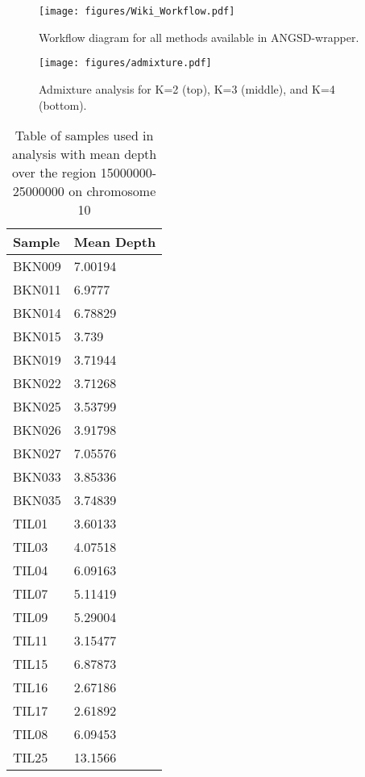 \renewcommand{\thefigure}{S\arabic{figure}}
\renewcommand{\thetable}{S\arabic{table}}
\setcounter{figure}{0}
\setcounter{table}{0}

\begin{figure}
\centering
\texttt{[image: figures/Wiki\_Workflow.pdf]}
\caption{Workflow diagram for all methods available in ANGSD-wrapper.}
\label{fig:supp2}
\end{figure}

\begin{figure}
\centering
\texttt{[image: figures/admixture.pdf]}
\caption{Admixture analysis for K=2 (top), K=3 (middle), and K=4 (bottom).}
\label{fig:suppadmix}
\end{figure}

\begin{table}
\begin{center}
	\begin{tabular} { | p{5cm} | p{5cm} | }
	\hline
	\textbf{Sample} & \textbf{Mean Depth} \\ \hline \hline
	BKN009 & 7.00194 \\ \hline
	BKN011 & 6.9777 \\ \hline
	BKN014 & 6.78829 \\ \hline
	BKN015 & 3.739 \\ \hline
	BKN019 & 3.71944 \\ \hline
	BKN022 & 3.71268 \\ \hline
	BKN025 & 3.53799 \\ \hline
	BKN026 & 3.91798 \\ \hline
	BKN027 & 7.05576 \\ \hline
	BKN033 & 3.85336 \\ \hline
	BKN035 & 3.74839 \\ \hline
	TIL01 & 3.60133 \\ \hline
	TIL03 & 4.07518 \\ \hline
	TIL04 & 6.09163 \\ \hline
	TIL07 & 5.11419 \\ \hline
	TIL09 & 5.29004 \\ \hline
	TIL11 & 3.15477 \\ \hline
	TIL15 & 6.87873 \\ \hline
	TIL16 & 2.67186 \\ \hline
	TIL17 & 2.61892 \\ \hline
	TIL08 & 6.09453 \\ \hline
	TIL25 & 13.1566 \\ \hline
	\end{tabular}
	\caption{Table of samples used in analysis with mean depth over the region 15000000-25000000 on chromosome 10}
	\label{tab:samples}
	\end{center}
\end{table}